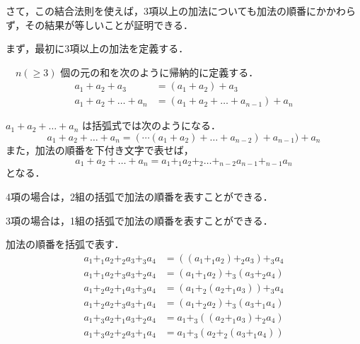 \documentclass[leqno,autodetect-engine, dvipdfmx-if-dvi,ja=standard]{bxjsarticle}
\begin{document}
	さて，この結合法則を使えば，3項以上の加法についても加法の順番にかかわらず，その結果が等しいことが証明できる．

	まず，最初に3項以上の加法を定義する．
	\begin{dfn}　$n (\ge 3)$ 個の元の和を次のように帰納的に定義する．
		\begin{align}
			a_1 + a_2 + a_3 &= (a_1 + a_2) + a_3 \\
			a_1 + a_2 + \dots + a_n &= (a_1 + a_2 + \dots + a_{n-1}) + a_n
		\end{align}
	\end{dfn}


	\begin{nb} $a_1 + a_2 + \dots + a_n$ は括弧式では次のようになる．
		\begin{equation}
		a_1 + a_2 + \dots + a_n = (\cdots(a_1 + a_2) + \dots + a_{n-2})+ a_{n-1}) + a_n
		\end{equation}
		また，加法の順番を下付き文字で表せば，
		\begin{equation}
		a_1 + a_2 + \dots + a_n = a_1 +_1 a_2 +_2 \dots +_{n-2} a_{n-1} +_{n-1} a_n
		\end{equation}
		となる．

		4項の場合は，2組の括弧で加法の順番を表すことができる．

		3項の場合は，1組の括弧で加法の順番を表すことができる．
	\end{nb}

	\begin{nb}加法の順番を括弧で表す．
		\begin{align}
			a_1 +_1 a_2 +_2 a_3 +_3 a_4 &=  ((a_1 +_1 a_2) +_2 a_3) +_3 a_4 \\
			a_1 +_1 a_2 +_3 a_3 +_2 a_4 &= (a_1 +_1 a_2) +_3 (a_3 +_2 a_4) \\
			a_1 +_2 a_2 +_1 a_3 +_3 a_4 &= (a_1 +_2 (a_2 +_1 a_3)) +_3 a_4 \\
			a_1 +_2 a_2 +_3 a_3 +_1 a_4 &= (a_1 +_2 a_2) +_3 (a_3 +_1 a_4) \\
			a_1 +_3 a_2 +_1 a_3 +_2 a_4 &= a_1 +_3 ((a_2 +_1 a_3) +_2 a_4) \\
			a_1 +_3 a_2 +_2 a_3 +_1 a_4 &= a_1 +_3 (a_2 +_2 (a_3 +_1 a_4))
		\end{align}
	\end{nb}
\end{document}
